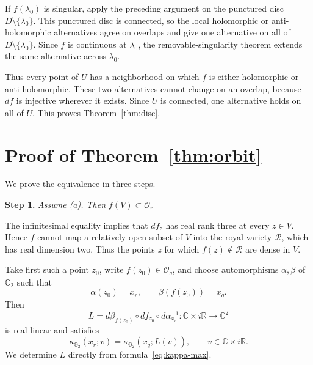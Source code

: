 \documentclass[12pt]{amsart}
\newcommand{\CC}{\mathbb C}
\newcommand{\RR}{\mathbb R}
\newcommand{\GG}{\mathbb G_2}
\newcommand{\cR}{\mathcal R}
\begin{document}
If $f(\lambda_0)$ is singular, apply the preceding argument on the punctured
disc $D\setminus\{\lambda_0\}$. This punctured disc is connected, so the local
holomorphic or anti-holomorphic alternatives agree on overlaps and give one
alternative on all of $D\setminus\{\lambda_0\}$. Since $f$ is continuous at
$\lambda_0$, the removable-singularity theorem extends the same alternative
across $\lambda_0$.

Thus every point of $U$ has a neighborhood on which $f$ is either holomorphic
or anti-holomorphic. These two alternatives cannot change on an overlap,
because $df$ is injective wherever it exists. Since $U$ is connected, one
alternative holds on all of $U$. This proves Theorem~\ref{thm:disc}.

\section{Proof of Theorem~\ref{thm:orbit}}

We prove the equivalence in three steps.

\medskip

\noindent
\textbf{Step 1.}
\emph{Assume \textup{(a)}. Then $f(V)\subset\mathcal O_r$}

\medskip

The infinitesimal equality implies that
$df_z$ has real rank three at every $z\in V$. Hence $f$ cannot
map a relatively open subset of $V$ into the royal variety $\cR$, which has
real dimension two. Thus the points $z$ for which
$f(z)\notin\cR$ are dense in $V$.

Take first such a point $z_0$, write $f(z_0)\in\mathcal O_q$, and
choose automorphisms $\alpha,\beta$ of $\GG$ such that
\[
 \alpha(z_0)=x_r,
 \qquad
 \beta(f(z_0))=x_q.
\]
Then
\[
 L=d\beta_{f(z_0)}\circ df_{z_0}\circ
 d\alpha^{-1}_{x_r}:\CC\times i\RR\longrightarrow\CC^2
\]
is real linear and satisfies
\[
 \kappa_{\GG}(x_r;v)=\kappa_{\GG}(x_q;L(v)),
 \qquad v\in\CC\times i\RR.
\]
We determine $L$ directly from formula~\eqref{eq:kappa-max}.
\end{document}

